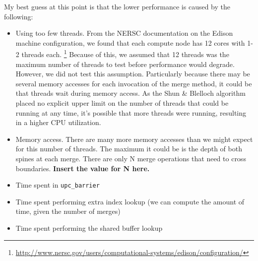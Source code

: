\documentclass[10pt]{article}
\begin{document}
My best guess at this point is that the lower performance is caused by the following:
\begin{itemize}
  \item Using too few threads.
        From the NERSC documentation on the Edison machine configuration, we found that each
        compute node has 12 cores with 1-2 threads each.
        \footnote{\url{http://www.nersc.gov/users/computational-systems/edison/configuration/}}
        Because of this, we assumed that 12 threads was the maximum number of threads to test before
        performance would degrade.
        However, we did not test this assumption.
        Particularly because there may be several memory accesses for each invocation of the merge
        method, it could be that threads wait during memory access.
        As the Shun \& Blelloch algorithm placed no explicit upper limit on the number of threads
        that could be running at any time, it's possible that more threads were running, resulting
        in a higher CPU utilization.
  \item Memory access.
        There are many more memory accesses than we might expect for this number of threads.
        The maximum it could be is the depth of both spines at each merge.
        There are only N merge operations that need to cross boundaries.
        \textbf{Insert the value for N here.}
        
  \item Time spent in \texttt{upc\_barrier}
  \item Time spent performing extra index lookup (we can compute the amount of time, given the number of merges)
  \item Time spent performing the shared buffer lookup
\end{itemize}
\end{document}
